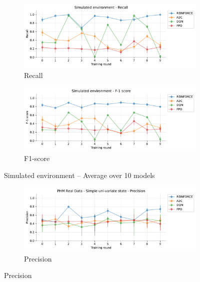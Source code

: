 \documentclass[a4paper, 12pt]{article}
\begin{document}
\begin{appendices}
\begin{figure}[h]
	\begin{subfigure}{\textwidth}
		\centering
		\includegraphics[width=\linewidth]{Simulated_Rc.pdf}  
		\caption{Recall}
		\label{fig:tr-sim-rc}
	\end{subfigure} \par\smallskip
	
	\begin{subfigure}{\textwidth}
		\centering
		\includegraphics[width=\linewidth]{Simulated_F1.pdf}  
		\caption{F1-score}
		\label{fig:tr-sim-f1}
	\end{subfigure} \par\smallskip
	
	
	\caption{Simulated environment -- Average over 10 models}
	\label{fig:tr-sim-env}
\end{figure}

\begin{figure}[h]
	\begin{subfigure}{\textwidth}
		\centering
		\includegraphics[width=\linewidth]{Singevariable_Pr.pdf}  
		\caption{Precision}
		\label{fig:tr-ss-pr}
	\end{subfigure} \par\smallskip
	

\end{figure}
\end{appendices}
\end{document}
